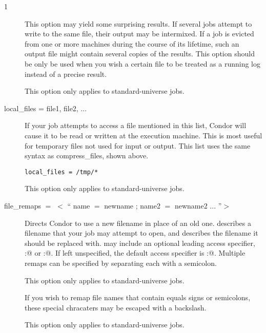 \begin{ManPage}{\label{man-condor-submit}}{1}
\begin{description}
This option may yield some surprising results.  If several
jobs attempt to write to the same file, their output may be intermixed.
If a job is evicted from one or more machines during the course of its
lifetime, such an output file might contain several copies of the results.
This option should be only be used when you wish a certain file to be
treated as a running log instead of a precise result.

This option only applies to standard-universe jobs.


\item[local\_files = file1, file2, ...]

If your job attempts to access a file mentioned in this list,
Condor will cause it to be read or written at the execution machine.
This is most useful for temporary files not used for input or output.
This list uses the same syntax as compress\_files, shown above.

\begin{verbatim}
local_files = /tmp/*
\end{verbatim}

This option only applies to standard-universe jobs.


\item[file\_remaps $=$ $<$ `` name $=$ newname ; name2 $=$ newname2 ... ''$>$ ]

Directs Condor to use a new filename in place of an old one.  
describes a filename that your job may attempt to open, and 
describes the filename it should be replaced with.
 may include an optional leading
access specifier, \verb@local:@ or \verb@remote:@.  If left unspecified,
the default access specifier is \verb@remote:@.  Multiple remaps can be 
specified by separating each with a semicolon.

This option only applies to standard-universe jobs.

If you wish to remap file names that contain equals signs or semicolons,
these special chracaters may be escaped with a backslash.

This option only applies to standard-universe jobs.


\end{description}
\end{ManPage}
